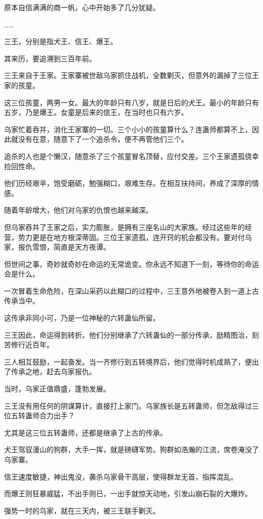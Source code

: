 \begin{this_body}
原本自信满满的商一帆，心中开始多了几分犹疑。

……

三王，分别是指犬王、信王、爆王。

其来历，要追溯到三百年前。

三王来自于王家。王家寨被世敌乌家抓住战机，全数剿灭，但意外的漏掉了三位王家的孩童。

这三位孩童，两男一女。最大的年龄只有八岁，就是日后的犬王。最小的年龄只有五岁，乃是爆王。女童是后来的信王，在当时也只有六岁。

乌家忙着吞并，消化王家寨的一切。三个小小的孩童算什么？连蛊师都算不上，因此就没有在意，随意下了一个追杀令，便不再管他们三个。

追杀的人也是个懒汉，随意杀了三个孩童冒名顶替，应付交差。三个王家遗孤侥幸捡回性命。

他们历经艰辛，饱受磨砺，勉强糊口，艰难生存。在相互扶持间，养成了深厚的情感。

随着年龄增大，他们对乌家的仇恨也越来越深。

但乌家吞并了王家之后，实力膨胀，是拥有三座名山的大家族。经过这些年的经营，势力更是在地方根深蒂固。三位王家遗孤，连开窍的机会都没有。要对付乌家，报仇雪恨，简直是天方夜谭。

但世间之事，奇妙就奇妙在命运的无常诡变。你永远不知道下一刻，等待你的命运会是什么。

一次冒着生命危险，在深山采药以此糊口的过程中，三王意外地被卷入到一道上古传承当中。

这传承非同小可，乃是一位神秘的六转蛊仙所留。

三王因此，命运得到转折。他们分别继承了六转蛊仙的一部分传承，励精图治，刻苦修行近百年。

三人相互鼓励，一起奋发。当一齐修行到五转境界后，他们觉得时机成熟了，便出了传承之地，赶去乌家报仇。

当时，乌家正值鼎盛，蓬勃发展。

三王没有用任何的阴谋算计，直接打上家门。乌家族长是五转蛊师，但怎敌得过三位五转蛊师合力出手？

尤其是这三位五转蛊师，还都是继承了上古的传承。

犬王驾驭漫山的狗群，大手一挥，就是磅礴军势。狗群如浩瀚的江流，席卷淹没了乌家寨。

信王速度敏捷，神出鬼没，袭杀乌家骨干高层，使得群龙无首，指挥混乱。

而爆王则狂暴威猛，不出手则已，一出手就惊天动地，引发山崩石裂的大爆炸。

强势一时的乌家，就在三天内，被三王联手剿灭。


\end{this_body}
